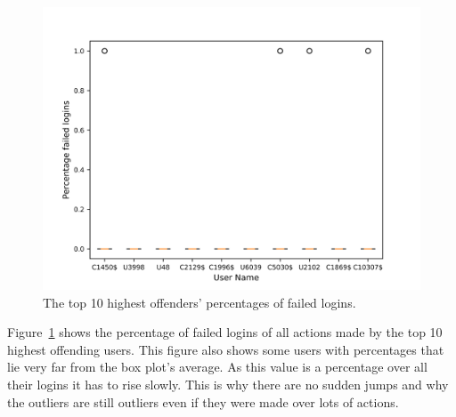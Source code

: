 \begin{figure}
	\begin{center}
		\includegraphics[scale=0.1]{evaluation/highest_offender_percentage_failed_logins}
	\end{center}
	\caption{The top 10 highest offenders' percentages of failed logins.~\label{fig:percentage_failed_logins}}
\end{figure}

Figure~\ref{fig:percentage_failed_logins} shows the percentage of failed logins of all actions made by the top 10 highest offending users. This figure also shows some users with percentages that lie very far from the box plot's average. As this value is a percentage over all their logins it has to rise slowly. This is why there are no sudden jumps and why the outliers are still outliers even if they were made over lots of actions.


